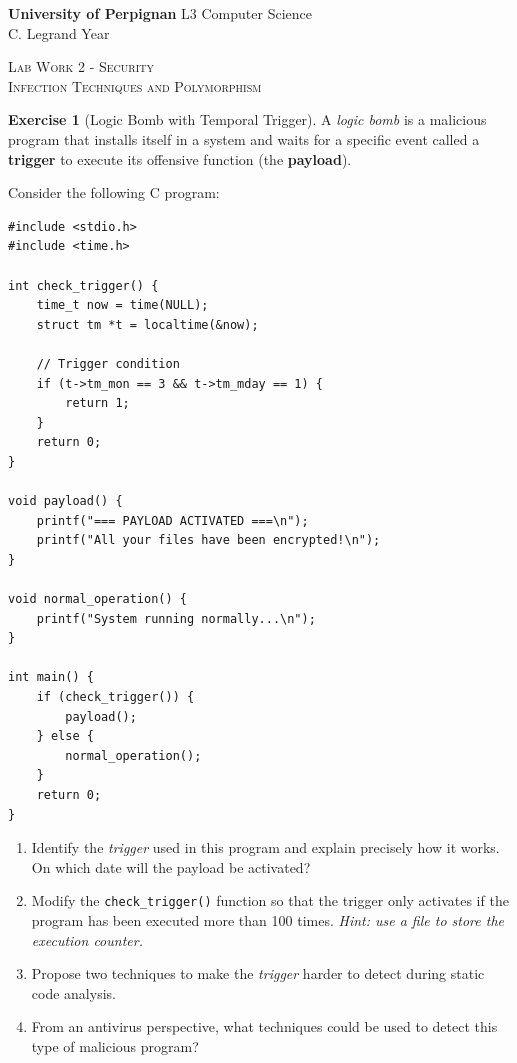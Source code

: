 \documentclass[a4paper,11pt]{article}
\theoremstyle{plain}
\theoremstyle{definition}
\newtheorem{exercice}{Exercise}
\begin{document}
\hbox{}
\noindent \textbf{University of Perpignan} \hfill  L3 Computer Science \\
 \hfill C. Legrand \hfill  Year \the\year \\
\smallskip
\begin{center}
{
  {\scshape \large Lab Work 2 - Security \\ Infection Techniques and Polymorphism}  \\
}
\end{center}
\hbox{}

\bigskip

\bigskip


\begin{exercice}[Logic Bomb with Temporal Trigger]

A \textit{logic bomb} is a malicious program that installs itself in a system and waits for a specific event called a \textbf{trigger} to execute its offensive function (the \textbf{payload}).

Consider the following C program:

\begin{verbatim}
#include <stdio.h>
#include <time.h>

int check_trigger() {
    time_t now = time(NULL);
    struct tm *t = localtime(&now);

    // Trigger condition
    if (t->tm_mon == 3 && t->tm_mday == 1) {
        return 1;
    }
    return 0;
}

void payload() {
    printf("=== PAYLOAD ACTIVATED ===\n");
    printf("All your files have been encrypted!\n");
}

void normal_operation() {
    printf("System running normally...\n");
}

int main() {
    if (check_trigger()) {
        payload();
    } else {
        normal_operation();
    }
    return 0;
}
\end{verbatim}

\begin{enumerate}
\item Identify the \textit{trigger} used in this program and explain precisely how it works. On which date will the payload be activated?

\item Modify the \texttt{check\_trigger()} function so that the trigger only activates if the program has been executed more than 100 times. \textit{Hint: use a file to store the execution counter.}

\item Propose two techniques to make the \textit{trigger} harder to detect during static code analysis.

\item From an antivirus perspective, what techniques could be used to detect this type of malicious program?
\end{enumerate}

\end{exercice}
\end{document}
